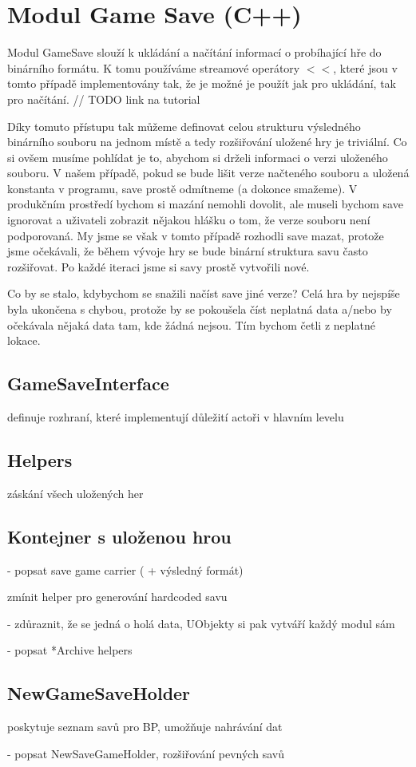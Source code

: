 
\section{Modul Game Save (C++)}

Modul GameSave slouží  k ukládání a načítání informací o probíhající hře do binárního formátu. K tomu používáme streamové operátory $<<$, které jsou v tomto případě implementovány tak, že je možné je použít jak pro ukládání, tak pro načítání. // TODO link na tutorial

Díky tomuto přístupu tak můžeme definovat celou strukturu výsledného binárního souboru na jednom místě a tedy rozšiřování uložené hry je triviální. Co si ovšem musíme pohlídat je to, abychom si drželi informaci o verzi uloženého souboru. V našem případě, pokud se bude lišit verze načteného souboru a uložená konstanta v programu, save prostě odmítneme (a dokonce smažeme). V produkčním prostředí bychom si mazání nemohli dovolit, ale museli bychom save ignorovat a uživateli zobrazit nějakou hlášku o tom, že verze souboru není podporovaná. My jsme se však v tomto případě rozhodli save mazat, protože jsme očekávali, že během vývoje hry se bude binární struktura savu často rozšiřovat. Po každé iteraci jsme si savy prostě vytvořili nové.

Co by se stalo, kdybychom se snažili načíst save jiné verze? Celá hra by nejspíše byla ukončena s chybou, protože by se pokoušela číst neplatná data a/nebo by očekávala nějaká data tam, kde žádná nejsou. Tím bychom četli z neplatné lokace.

\subsection{GameSaveInterface}
definuje rozhraní, které implementují důležití actoři v hlavním levelu

\subsection{Helpers}
záskání všech uložených her

\subsection{Kontejner s uloženou hrou}


- popsat save game carrier ( + výsledný formát)

zmínit helper pro generování hardcoded savu

- zdůraznit, že se jedná o holá data, UObjekty si pak vytváří každý modul sám

- popsat *Archive helpers 

\subsection{NewGameSaveHolder}

poskytuje seznam savů pro BP, umožňuje nahrávání dat

- popsat NewSaveGameHolder, rozšiřování pevných savů 









